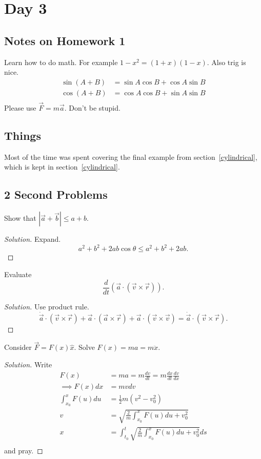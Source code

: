 \section{Day 3}

\subsection{Notes on Homework 1}
Learn how to do math. For example $1 - x^2 = (1 + x)(1 - x)$. Also trig
is nice.
\[ \begin{aligned}
\sin (A + B) &= \sin A \cos B + \cos A \sin B \\
\cos (A + B) &= \cos A \cos B + \sin A \sin B \\
\end{aligned} \]
Please use $\vec{F} = m \vec{a}$. Don't be stupid.

\subsection{Things}
Most of the time was spent covering the final example from
section~\ref{cylindrical}, which is kept in section~\ref{cylindrical}.

\subsection{2 Second Problems}
\begin{prb}
Show that $|\vec{a} + \vec{b}| \leq a + b$.
\end{prb}
\begin{proof}[Solution]
Expand.
\[ a^2 + b^2 + 2ab\cos\theta \leq a^2 + b^2 + 2ab. \]
\end{proof}

\begin{prb}
Evaluate
\[ \frac{d}{dt}\left(\vec{a} \cdot \left( \vec{v} \times \vec{r} \right)
\right). \]
\end{prb}
\begin{proof}[Solution]
Use product rule.
\[ \dot{\vec{a}} \cdot \left(\vec{v} \times \vec{r}\right)  + \vec{a}
\cdot \left(\vec{a} \times \vec{r}\right) + \vec{a} \cdot \left(\vec{v}
\times \vec{v}\right) = \dot{\vec{a}} \cdot \left(\vec{v} \times \vec{r}
\right). \]
\end{proof}

\begin{prb}
Consider $\vec{F} = F(x) \hat{x}$. Solve $F(x) = ma = m \ddot{x}$.
\end{prb}
\begin{proof}[Solution]
Write
\[ \begin{aligned}
F(x) &= ma = m \frac{dv}{dt} = m \frac{dx}{dt} \frac{dv}{dx} \\
\implies F(x) dx &= mv dv \\
\int_{x_0}^x F(u) du &= \frac{1}{2} m(v^2 - v_0^2) \\
v &= \sqrt{\frac{2}m \int_{x_0}^x F(u) du + v_0^2} \\
x &= \int_{t_0}^t \sqrt{\frac{2}m \int_{x_0}^x F(u) du + v_0^2} ds \\
\end{aligned} \]
and pray.
\end{proof}

